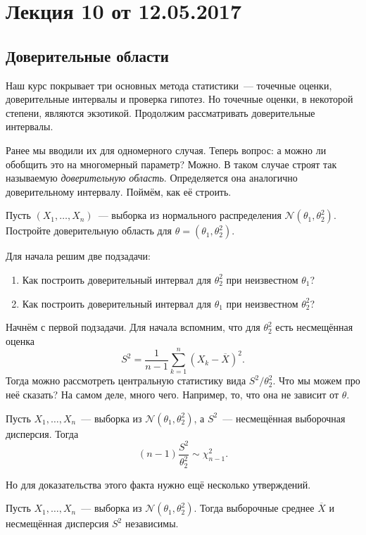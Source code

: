 \section{Лекция 10 от 12.05.2017}
\subsection{Доверительные области}
Наш курс покрывает три основных метода статистики~--- точечные оценки, доверительные 
интервалы и проверка гипотез. Но точечные оценки, в некоторой степени, являются 
экзотикой. Продолжим рассматривать доверительные интервалы.

Ранее мы вводили их для одномерного случая. Теперь вопрос: а можно ли обобщить это на 
многомерный параметр? Можно. В таком случае строят так называемую \emph{доверительную 
область}. Определяется она аналогично доверительному интервалу. Поймём, как её строить.

\begin{problem}
    Пусть \((X_{1}, \dots, X_{n})\)~--- выборка из нормального распределения 
    \(\mathcal{N}(\theta_{1}, \theta_{2}^{2})\). Постройте доверительную область для 
    \(\theta = (\theta_{1}, \theta_{2}^{2})\).
\end{problem}

Для начала решим две подзадачи:
\begin{enumerate}
    \item Как построить доверительный интервал для \(\theta_{2}^{2}\) при неизвестном 
    \(\theta_{1}\)?
    \item Как построить доверительный интервал для \(\theta_{1}\) при неизвестном 
    \(\theta_{2}^{2}\)?
\end{enumerate}

Начнём с первой подзадачи. Для начала вспомним, что для \(\theta_{2}^{2}\) есть 
несмещённая оценка
\[
    S^{2} = \frac{1}{n - 1}\sum_{k = 1}^{n} (X_{k} - \overline{X})^{2}.
\]
Тогда можно рассмотреть центральную статистику вида \(S^{2}/\theta_{2}^{2}\). Что мы 
можем про неё сказать? На самом деле, много чего. Например, то, что она не зависит от 
\(\theta\). 

\begin{theorem}
    Пусть \(X_{1}, \dots, X_{n}\)~--- выборка из \(\mathcal{N}(\theta_{1}, 
    \theta_{2}^{2})\), а \(S^{2}\)~--- несмещённая выборочная дисперсия. Тогда
    \[
        (n - 1)\frac{S^{2}}{\theta_{2}^{2}} \sim \chi^{2}_{n - 1}.
    \]
\end{theorem}

Но для доказательства этого факта нужно ещё несколько утверждений.
\begin{theorem}
    Пусть \(X_{1}, \dots, X_{n}\)~--- выборка из \(\mathcal{N}(\theta_{1}, 
    \theta_{2}^{2})\). Тогда выборочные среднее \(\overline{X}\) и несмещённая дисперсия 
    \(S^{2}\) независимы.
\end{theorem}

